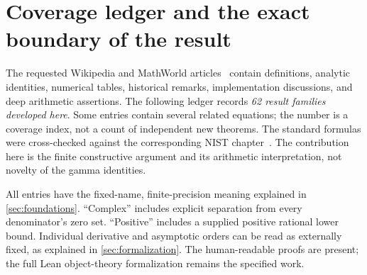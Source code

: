 \section{Coverage ledger and the exact boundary of the result}
\label{sec:coverage}

The requested Wikipedia and MathWorld articles~\cite{wiki,mathworld}
contain definitions, analytic identities, numerical tables, historical
remarks, implementation discussions, and deep arithmetic assertions.
The following ledger records \emph{62 result families developed here}.
Some entries contain several related equations; the number is a coverage
index, not a count of independent new theorems. The standard formulas
were cross-checked against the corresponding NIST chapter~\cite{dlmf}.
The contribution here is the finite constructive argument and its
arithmetic interpretation, not novelty of the gamma identities.

All entries have the fixed-name, finite-precision meaning explained in
\cref{sec:foundations}. ``Complex'' includes explicit separation from
every denominator's zero set. ``Positive'' includes a supplied positive
rational lower bound. Individual derivative and asymptotic orders can
be read as externally fixed, as explained in
\cref{sec:formalization}. The human-readable proofs are present; the
full Lean object-theory formalization remains the specified work.

